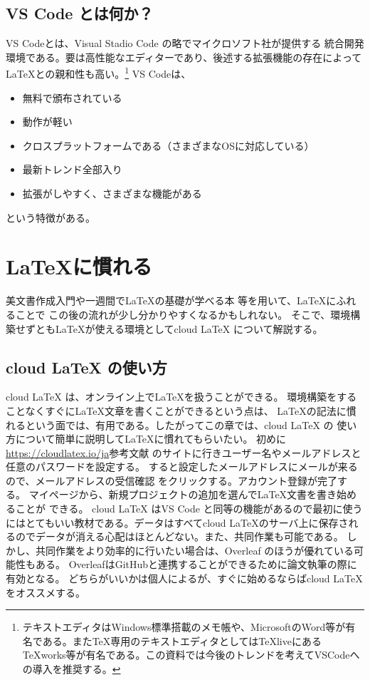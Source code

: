 \documentclass[titlepage]{ltjsarticle}
\begin{document}
\subsection{VS Code とは何か？}
VS Codeとは、Visual Stadio Code の略でマイクロソフト社が提供する
統合開発環境である。要は高性能なエディターであり、後述する拡張機能の存在によって\LaTeX との親和性も高い。\footnote{テキストエディタはWindows標準搭載のメモ帳や、MicrosoftのWord等が有名である。またTeX専用のテキストエディタとしてはTeXliveにあるTeXworks等が有名である。この資料では今後のトレンドを考えてVSCodeへの導入を推奨する。}
VS Codeは、
\begin{itemize}
  \item 無料で頒布されている
  \item 動作が軽い
  \item クロスプラットフォームである（さまざまなOSに対応している）
  \item 最新トレンド全部入り
  \item 拡張がしやすく、さまざまな機能がある
\end{itemize}
という特徴がある。

\section{\LaTeX に慣れる}
美文書作成入門\cite{美文書本}や一週間で\LaTeX の基礎が学べる本
\cite{一週間基礎}等を用いて、\LaTeX にふれることで
この後の流れが少し分かりやすくなるかもしれない。
そこで、環境構築せずとも\LaTeX が使える環境としてcloud LaTeX 
について解説する。

\subsection{cloud LaTeX の使い方}
cloud LaTeX は、オンライン上で\LaTeX を扱うことができる。
環境構築をすることなくすぐに\LaTeX 文章を書くことができるという点は、
\LaTeX の記法に慣れるという面では、有用である。したがってこの章では、cloud LaTeX の
使い方について簡単に説明して\LaTeX に慣れてもらいたい。
初めに
\url{https://cloudlatex.io/ja}参考文献\cite{cloudlatexログインページ}
のサイトに行きユーザー名やメールアドレスと任意のパスワードを設定する。
すると設定したメールアドレスにメールが来るので、メールアドレスの受信確認
をクリックする。アカウント登録が完了する。
マイページから、新規プロジェクトの追加を選んで\LaTeX 文書を書き始めることが
できる。
cloud LaTeX はVS Code と同等の機能があるので最初に使うにはとてもいい教材である。データはすべてcloud LaTeXのサーバ上に保存されるのでデータが消える心配はほとんどない。また、共同作業も可能である。
しかし、共同作業をより効率的に行いたい場合は、Overleaf のほうが優れている可能性もある。
OverleafはGitHubと連携することができるために論文執筆の際に有効となる。
どちらがいいかは個人によるが、すぐに始めるならばcloud LaTeX をオススメする。
\end{document}
